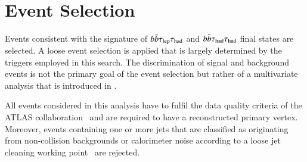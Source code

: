 \section{Event Selection}%
\label{sec:event_selection}

Events consistent with the signature of $b\bar{b}\tau_{\text{lep}}\tau_{\text{had}}$ and $b\bar{b}\tau_{\text{had}}\tau_{\text{had}}$
final states are selected. A loose event selection is applied that is largely
determined by the triggers employed in this search. The discrimination of signal
and background events is not the primary goal of the event selection but rather
of a multivariate analysis that is introduced in
.

All events considered in this analysis have to fulfil the data quality criteria
of the ATLAS collaboration~\cite{DAPR-2018-01} and are required to have a
reconstructed primary vertex. Moreover, events containing one or more jets that
are classified as originating from non-collision backgrounds or calorimeter
noise according to a loose jet cleaning working point~\cite{ATLAS-CONF-2015-029}
are rejected.





